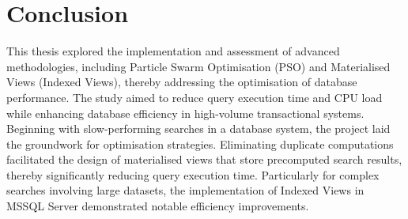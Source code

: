 \section{Conclusion}
This thesis explored the implementation and assessment of advanced methodologies, including Particle Swarm Optimisation (PSO) and Materialised Views (Indexed Views), thereby addressing the optimisation of database performance. The study aimed to reduce query execution time and CPU load while enhancing database efficiency in high-volume transactional systems. 
Beginning with slow-performing searches in a database system, the project laid the groundwork for optimisation strategies. Eliminating duplicate computations facilitated the design of materialised views that store precomputed search results, thereby significantly reducing query execution time. Particularly for complex searches involving large datasets, the implementation of Indexed Views in MSSQL Server demonstrated notable efficiency improvements.

